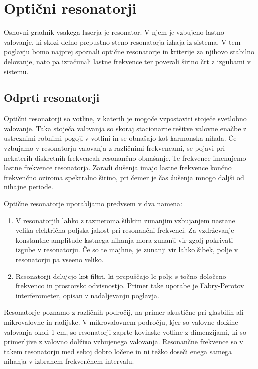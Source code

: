 
\chapter{Optični resonatorji}
Osnovni gradnik vsakega laserja je resonator. V njem je vzbujeno lastno valovanje,
ki skozi delno prepustno steno resonatorja izhaja iz sistema. V tem poglavju bomo 
najprej spoznali optične resonatorje in kriterije za njihovo stabilno delovanje,
nato pa izračunali lastne frekvence ter povezali širino črt z izgubami v sistemu. 

\section{Odprti resonatorji}
Optični resonatorji so votline, v katerih je mogoče 
vzpostaviti stoječe svetlobno valovanje. Taka stoječa valovanja so skoraj 
stacionarne rešitve valovne enačbe z ustreznimi robnimi pogoji v votlini 
in se obnašajo kot harmonska nihala. Če vzbujamo v resonatorju valovanja z 
različnimi frekvencami, se pojavi pri nekaterih diskretnih frekvencah resonančno
obnašanje. Te frekvence imenujemo lastne frekvence
resonatorja. Zaradi dušenja imajo lastne frekvence končno frekvenčno oziroma spektralno 
širino, pri čemer je čas dušenja mnogo daljši od nihajne periode. 

Optične resonatorje uporabljamo predvsem v dva namena:
\begin{enumerate}
\item V resonatorjih lahko z razmeroma šibkim zunanjim vzbujanjem nastane velika
električna poljska jakost pri resonančni frekvenci. Za vzdrževanje
konstantne amplitude lastnega nihanja mora zunanji vir zgolj pokrivati izgube
v resonatorju. Če so te majhne, je zunanji vir lahko šibek, polje
v resonatorju pa vseeno veliko.\\
\item Resonatorji delujejo kot filtri, ki prepuščajo le polje s točno  
določeno frekvenco in prostorsko odvisnostjo. Primer take uporabe je 
Fabry-Perotov interferometer, opisan 
v nadaljevanju poglavja. 
\end{enumerate}

Resonatorje poznamo z različnih področij, na primer akustične pri glasbilih ali 
mikrovalovne in radijske. V mikrovalovnem področju, kjer so valovne dolžine valovanja
okoli 1 cm, so resonatorji zaprte kovinske votline z dimenzijami, ki so primerljive z 
valovno dolžino vzbujenega valovanja. Resonančne frekvence so v takem resonatorju 
med seboj dobro ločene in ni težko doseči enega samega nihanja v izbranem 
frekvenčnem intervalu.

